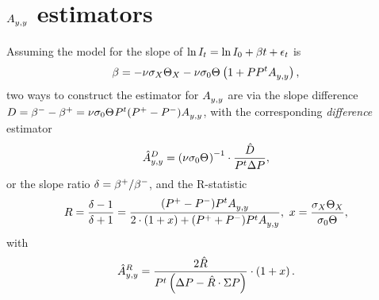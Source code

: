 \documentclass{article}
\newcommand{\err}{\epsilon}
\begin{document}
\section{$\Ayy$ estimators}

Assuming the model for the slope of $\ln I_t = \ln I_0 + \slp t + \err_t$ is 
\[
\slp = -\nu\CS[X]\Thick[X] - \nu\CS[0]\Thick\bkt{1 + PP^t \Ayy},
\]
two ways to construct the estimator for $\Ayy$ are via the slope difference $\D = \slp^- - \slp^+ = \nu\CS[0]\Thick P^t \DP* \Ayy$, with the corresponding \emph{difference} estimator 
\[
	\Ayy*[D] = \bkt{\nu\CS[0]\Thick}^{-1}\cdot\frac{\D*}{P^t\DP},
\]
or the slope ratio $\delta = \slp^+/\slp^-$, and the R-statistic
\[
	\R = \frac{\delta - 1}{\delta + 1} = \frac{\DP* P^t\Ayy}{2\cdot\bkt{1 + x} + \SP* P^t\Ayy}, ~x = \frac{\CS[X]\Thick[X]}{\CS[0]\Thick},
\]
with
\[
	\Ayy*[R] = \frac{2\R*}{P^t\bkt{\DP -\R*\cdot\SP}}\cdot\bkt{1+x}.
\]
\end{document}
